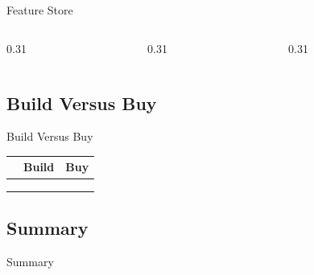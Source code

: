 \begin{frame}{Feature Store}
  \begin{columns}[T,onlytextwidth]
    \begin{column}{0.31\textwidth}
      \begin{tdblock}[equal height group=fs]
      \end{tdblock}
    \end{column}
    \begin{column}{0.31\textwidth}
      \begin{tdblock}[equal height group=fs]
      \end{tdblock}
    \end{column}
    \begin{column}{0.31\textwidth}
      \begin{tdblock}[equal height group=fs]
      \end{tdblock}
    \end{column}
  \end{columns}
\end{frame}

\subsection{Build Versus Buy}

\begin{frame}{Build Versus Buy}
  \footnotesize
  \renewcommand{\arraystretch}{1.35}
  \begin{tabular}{@{}%
    >{\raggedright\arraybackslash}p{}%
    >{\raggedright\arraybackslash}p{}%
    >{\raggedright\arraybackslash}p{}@{}}
    \toprule
     & \textbf{Build} & \textbf{Buy}\\
    \midrule
     & & \\
     & & \\
     & & \\
    \bottomrule
  \end{tabular}
\end{frame}

\subsection{Summary}

\begin{frame}{Summary}
  \begin{takeaway}
  \end{takeaway}
\end{frame}

\chapterreferences
